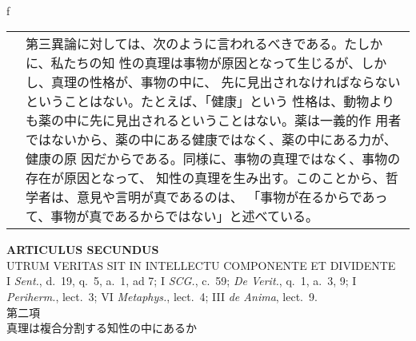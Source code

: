 \\f\documentclass[10pt]{jsarticle} %
\begin{document}
\begin{longtable}{p{21em}p{21em}}
&

第三異論に対しては、次のように言われるべきである。たしかに、私たちの知
性の真理は事物が原因となって生じるが、しかし、真理の性格が、事物の中に、
先に見出されなければならないということはない。たとえば、「健康」という
性格は、動物よりも薬の中に先に見出されるということはない。薬は一義的作
用者ではないから、薬の中にある健康ではなく、薬の中にある力が、健康の原
因だからである。同様に、事物の真理ではなく、事物の存在が原因となって、
知性の真理を生み出す。このことから、哲学者は、意見や言明が真であるのは、
「事物が在るからであって、事物が真であるからではない」と述べている。
\end{longtable}
\newpage


\begin{center}
 {\Large {\bf ARTICULUS SECUNDUS}}\\
 {\large UTRUM VERITAS SIT IN INTELLECTU COMPONENTE ET DIVIDENTE}\\
 {\footnotesize I {\itshape Sent.}, d.~19, q.~5, a.~1, ad 7; I {\itshape
 SCG.}, c.~59; {\itshape De Verit.}, q.~1, a.~3, 9; I {\itshape
 Periherm.}, lect.~3; VI {\itshape Metaphys.}, lect.~4; III {\itshape de
 Anima}, lect.~9.}\\
 {\Large 第二項\\真理は複合分割する知性の中にあるか}
\end{center}
\end{document}
